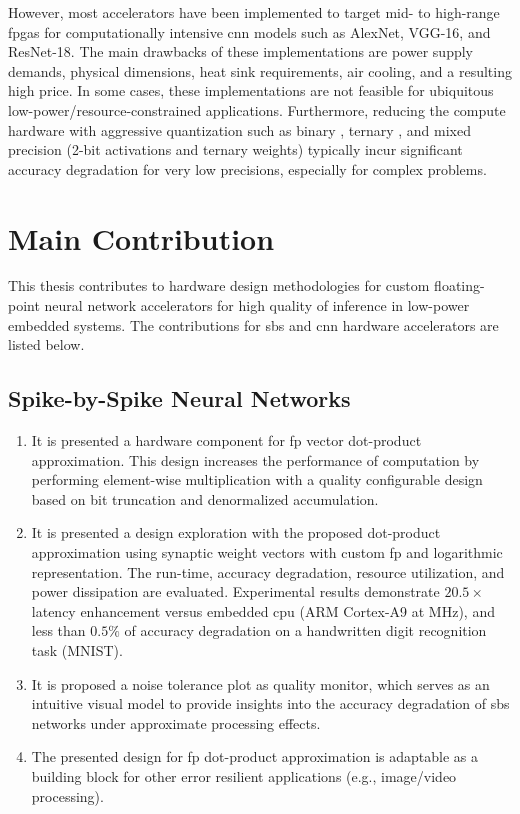 \begin{itemize}
However, most accelerators have been implemented to target mid- to high-range \glspl{fpga} for computationally intensive \gls{cnn} models such as AlexNet, VGG-16, and ResNet-18. The main drawbacks of these implementations are power supply demands, physical dimensions, heat sink requirements, air cooling, and a resulting high price. In some cases, these implementations are not feasible for ubiquitous low-power/resource-constrained applications. Furthermore, reducing the compute hardware with aggressive quantization such as binary \cite{courbariaux2015binaryconnect}, ternary \cite{lin2015neural}, and mixed precision (2-bit activations and ternary weights) \cite{colangelo2018exploration} typically incur significant accuracy degradation for very low precisions, especially for complex problems\cite{faraone2019addnet}.

\end{itemize}

\section{Main Contribution}
This thesis contributes to hardware design methodologies for custom floating-point neural network accelerators for high quality of inference in
 low-power embedded systems. The contributions for \gls{sbs} and \gls{cnn} hardware accelerators are listed below.

\subsection{Spike-by-Spike Neural Networks}
\begin{enumerate}
	\item It is presented a hardware component for \gls{fp} vector dot-product approximation. This design increases the performance of computation by performing element-wise multiplication with a quality configurable design based on bit truncation and denormalized accumulation.
	\item It is presented a design exploration with the proposed dot-product approximation using synaptic weight vectors with custom \gls{fp} and logarithmic representation. The run-time, accuracy degradation, resource utilization, and power dissipation are evaluated. Experimental results demonstrate $20.5\times$ latency enhancement versus embedded \gls{cpu} (ARM Cortex-A9 at \unit[666]{MHz}), and less than $0.5\%$ of accuracy degradation on a handwritten digit recognition task (MNIST).
	\item It is proposed a noise tolerance plot as quality monitor, which serves as an intuitive visual model to provide insights into the accuracy degradation of \gls{sbs} networks under approximate processing effects.
	\item The presented design for \gls{fp} dot-product approximation is adaptable as a building block for other error resilient applications (e.g., image/video processing).
\end{enumerate}


